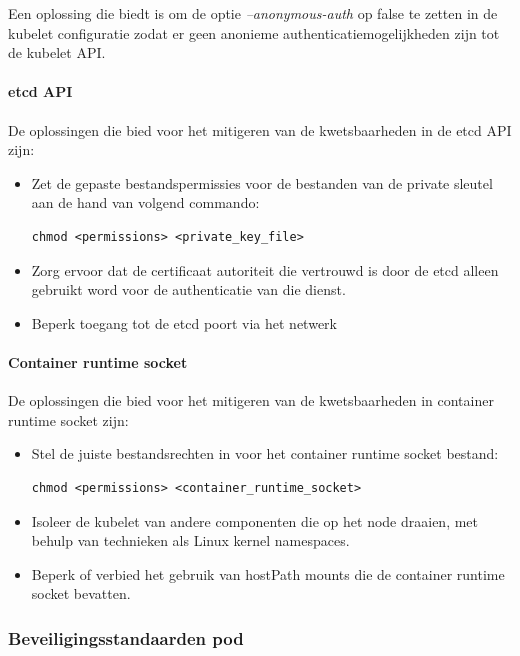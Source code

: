 Een oplossing die \textcite{OWASP-2023} biedt is om de optie \textit{--anonymous-auth} op false te zetten in de kubelet configuratie zodat er geen anonieme authenticatiemogelijkheden zijn tot de kubelet API.

\paragraph{etcd API}
De oplossingen die \textcite{KubernetesDocs-2023} bied voor het mitigeren van de kwetsbaarheden in de etcd API zijn:
\begin{itemize}
    \item Zet de gepaste bestandspermissies voor de bestanden van de private sleutel aan de hand van volgend commando:
\begin{lstlisting}[language=tex, caption={Opzetten gepaste bestandspermissies voor private sleutel}]
chmod <permissions> <private_key_file>
\end{lstlisting}
    \item Zorg ervoor dat de certificaat autoriteit die vertrouwd is door de etcd alleen gebruikt word voor de authenticatie van die dienst. 
    \item Beperk toegang tot de etcd poort via het netwerk
\end{itemize}

\paragraph{Container runtime socket}
De oplossingen die \textcite{KubernetesDocs-2023} bied voor het mitigeren van de kwetsbaarheden in container runtime socket zijn:
\begin{itemize}
    \item Stel de juiste bestandsrechten in voor het container runtime socket bestand:
\begin{lstlisting}[language=tex, caption={Opzetten juiste bestandsrechten voor container runtime socket}]
chmod <permissions> <container_runtime_socket>
\end{lstlisting}
    \item Isoleer de kubelet van andere componenten die op het node draaien, met behulp van technieken als Linux kernel namespaces.
    \item Beperk of verbied het gebruik van hostPath mounts die de container runtime socket bevatten.
\end{itemize}

\subsubsection{Beveiligingsstandaarden pod}
